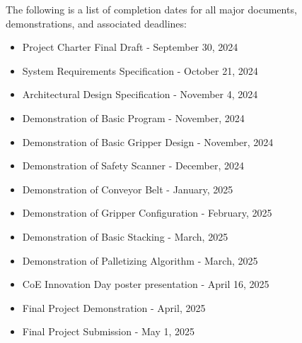 The following is a list of completion dates for all major documents, demonstrations, and associated deadlines:
\begin{itemize}
  \item Project Charter Final Draft             - September 30, 2024
  \item System Requirements Specification       - October   21, 2024
  \item Architectural Design Specification      - November   4, 2024
  \item Demonstration of Basic Program          - November,     2024
  \item Demonstration of Basic Gripper Design   - November,     2024
  \item Demonstration of Safety Scanner         - December,     2024
  \item Demonstration of Conveyor Belt          - January,      2025
  \item Demonstration of Gripper Configuration  - February,     2025
  \item Demonstration of Basic Stacking         - March,        2025
  \item Demonstration of Palletizing Algorithm  - March,        2025
  \item CoE Innovation Day poster presentation  - April     16, 2025
  \item Final Project Demonstration             - April,        2025    
  \item Final Project Submission                - May        1, 2025
\end{itemize}

